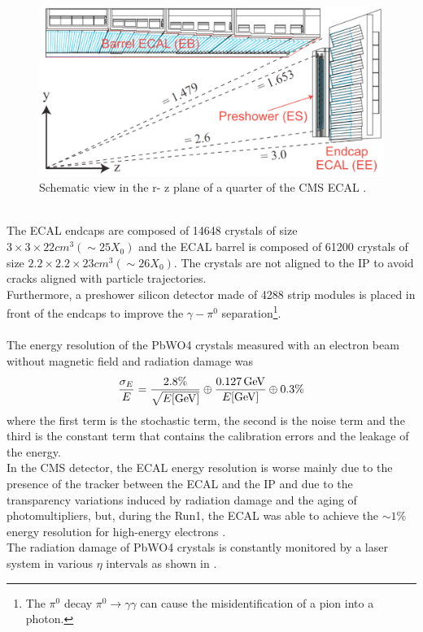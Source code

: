 \begin{figure}[h!]
    \centering
    \includegraphics[width=0.7\linewidth]{ecal.png}
    \caption{Schematic view in the r- z plane of a quarter of the CMS ECAL \cite{Benaglia2014TheExamples}.}
    \label{fig:ecal}
\end{figure}
\\
The ECAL endcaps are composed of 14648 crystals of size $3\times3\times22 cm^3 (\sim25X_0)$ and the ECAL barrel is composed of 61200 crystals of size $2.2\times2.2\times23 cm^3 (\sim26X_0)$. The crystals are not aligned to the IP to avoid cracks aligned with particle trajectories.\\
Furthermore, a preshower silicon detector made of 4288 strip modules is placed in front of the endcaps to improve the $\gamma-\pi^0$ separation\footnote{The $\pi^0$ decay $\pi^0 \to \gamma \gamma$ can cause the misidentification of a pion into a photon.}.
\\
\\
The energy resolution of the PbWO4 crystals measured with an electron beam without magnetic field and radiation damage was \cite{Adzic2007EnergyCalorimeter} 
\begin{equation}
    {\frac{\sigma_{E}}{E}}={\frac{2.8\%}{\sqrt{E[{\mathrm{GeV}}]}}}\oplus{\frac{0.127 {\ensuremath{\,\text{Ge\hspace{-.08em}V}}}}{E[{\mathrm{GeV}}]}}\oplus0.3\%
\end{equation}
where the first term is the stochastic term, the second is the noise term and the third is the constant term that contains the calibration errors and the leakage of the energy.\\
In the CMS detector, the ECAL energy resolution is worse mainly due to the presence of the tracker between the ECAL and the IP and due to the transparency variations induced by radiation damage and the aging of photomultipliers, but, during the Run1, the ECAL was able to achieve the $\sim1\%$ energy resolution for high-energy electrons \cite{Chatrchyan2013EnergyTeV}.\\
The radiation damage of PbWO4 crystals is constantly monitored by a laser system in various $\eta$ intervals as shown in .
